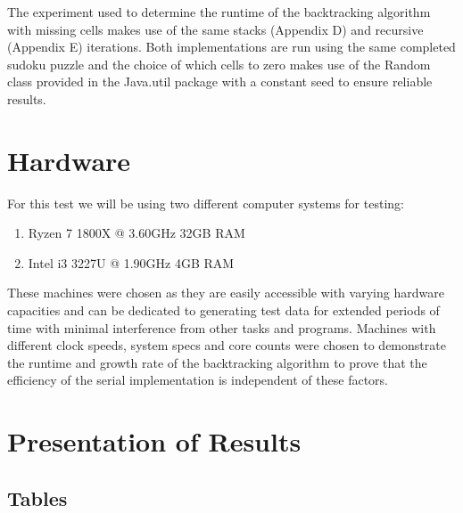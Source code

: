\documentclass[11pt]{article}
\begin{document}
\vspace{5mm} %
The experiment used to determine the runtime of the backtracking algorithm with missing cells makes use of the same stacks (Appendix D) and recursive (Appendix E) iterations. 
Both implementations are run using the same completed sudoku puzzle and the choice of which cells to zero makes use of the Random class provided in the Java.util package with a
 constant seed to ensure reliable results.

\section{Hardware}
For this test we will be using two different computer systems for testing:
\begin{enumerate}
\item Ryzen 7 1800X @ 3.60GHz 32GB RAM
\item Intel i3 3227U @ 1.90GHz 4GB RAM
\end{enumerate}
These machines were chosen as they are easily accessible with varying hardware capacities and can be dedicated to generating test data for extended periods of time with minimal 
interference from other tasks and programs. Machines with different clock speeds, system specs and core counts were chosen to demonstrate the runtime and growth rate of the 
backtracking algorithm to prove that the efficiency of the serial implementation is independent of these factors.  

\section{Presentation of Results}
\subsection{Tables}
\end{document}

